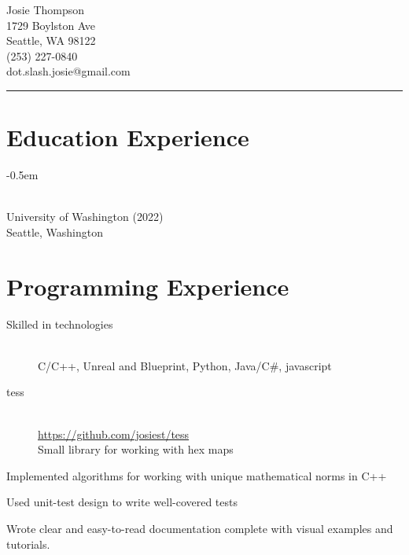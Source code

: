\documentclass[10pt]{article}
\newenvironment{itemize*}
{\begin{itemize}[leftmargin=*]
    \setlength{\parskip}{0.5pt}}
{\end{itemize}}
\begin{document}
\noindent
\parbox[t]{0.5\textwidth}{
    {\sffamily\Huge Josie Thompson}\medskip\\
    1729 Boylston Ave\\
    Seattle, WA 98122\\
    (253) 227-0840\\
    dot.slash.josie@gmail.com
}
\vspace{12pt}
\hrule


\begin{paracol}{2}
\section*{Education Experience}
\begin{description}
\itemsep -0.5em
\item[B.S. in Computer Science] \hfill \\
    University of Washington (2022)\\
    Seattle, Washington
\end{description}

\section*{Programming Experience}
\begin{description}
\item[Skilled in technologies] \hfill \\
C/C++, Unreal and Blueprint, Python, Java/C\#, javascript
\end{description}

\begin{description}
\item[tess] \hfill \\
    \url{https://github.com/josiest/tess}\\
    Small library for working with hex maps
\end{description}
\begin{itemize*}
\item Implemented algorithms for working with unique mathematical norms in C++
\item Used unit-test design to write well-covered tests
\item Wrote clear and easy-to-read documentation complete with visual examples
      and tutorials.
\end{itemize*}


\end{paracol}
\end{document}
